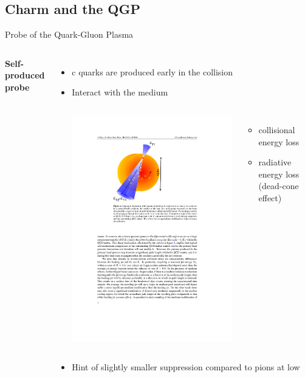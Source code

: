 \documentclass{beamer}
\begin{document}
\subsection{Charm and the QGP}
\begin{frame}{Probe of the Quark-Gluon Plasma}
\begin{columns}
\textbf{\alert{Self-produced probe}}
\begin{itemize}
\item c quarks are \alert{produced early} in the collision
\item Interact with the medium
\begin{columns}
\includegraphics[width=\textwidth]{img/jetquenching}
\begin{itemize}
\item collisional energy loss
\item radiative energy loss (\alert{dead-cone effect})
\end{itemize}
\end{columns}
\item Hint of slightly \alert{smaller suppression} compared to pions at low \pt
\end{itemize}


\end{columns}
\end{frame}
\end{document}
